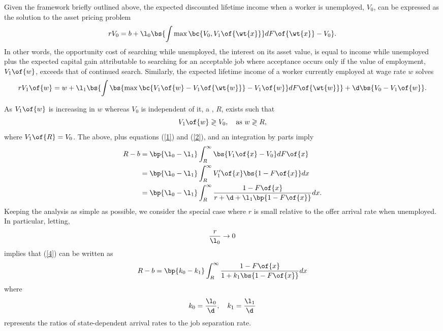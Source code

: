 \documentclass[12pt]{article}
\newcommand{\highlightB}[1]{{\emph{\color{MyBlue}{#1}}}}
\theoremstyle{definition}
\begin{document}
Given the framework briefly outlined above, the expected discounted lifetime income when a worker is unemployed, $V_0$, can be expressed as the solution to the asset pricing problem 
\begin{equation}
    \label{1}
    r V_0 = b + \l_0 \bs{\int \max \bc{V_0, V_1\of{\wt{x}}} d F\of{\wt{x}} - V_0}.
\end{equation}
In other words, the opportunity cost of searching while unemployed, the interest on its asset value, is equal to income while unemployed plus the expected capital gain attributable to searching for an acceptable job where acceptance occurs only if the value of employment, $V_1\of{w}$, exceeds that of continued search. Similarly, the expected lifetime income of a worker currently employed at wage rate $w$ solves 
\begin{equation}
    \label{2}
    r V_1\of{w} = w + \l_1 \bs{ \int \bs{\max\bc{V_1\of{w} - V_1\of{\wt{w}}} - V_1\of{w}} d F\of{\wt{w}}} + \d \bs{V_0 - V_1\of{w}}.
\end{equation}

As $V_1\of{w}$ is increasing in $w$ whereas $V_0$ is independent of it, a \highlightB{reservation wage}, $R$, exists such that 
\begin{equation}
    V_1\of{w} \gtrless V_0, \quad \text{as  } w \gtrless R,
\end{equation}
where $V_1\of{R} = V_0$. The above, plus equations (\ref{1}) and (\ref{2}), and an integration by parts imply 
\begin{equation}
    \label{4}
    \begin{aligned}
        R - b & = \bp{\l_0 - \l_1} \int_{R}^{\infty} \bs{V_1\of{x} - V_0} dF\of{x} \\
        & = \bp{\l_0 - \l_1} \int_{R}^{\infty} V_1^\prime\of{x}\bs{1 - F\of{x}} dx \\
        & = \bp{\l_0 - \l_1} \int_{R}^{\infty} \frac{1 - F\of{x}}{r + \d + \l_1 \bp{1 - F\of{x}}} dx. 
    \end{aligned}
\end{equation}
Keeping the analysis as simple as possible, we consider the special case where $r$ is small relative to the offer arrival rate when unemployed. In particular, letting, $$\frac{r}{\l_0} \rightarrow 0$$ implies that (\ref{4}) can be written as 
\begin{equation}
    \label{5}
    R - b = \bp{k_0 - k_1} \int_{R}^{\infty} \frac{1 - F\of{x}}{1 + k_1\bs{1 - F\of{x}}} d x
\end{equation}
where 
\begin{equation}
    \label{6}
    k_0 = \frac{\l_0}{\d}, \quad k_1 = \frac{\l_1}{\d}
\end{equation}
represents the ratios of state-dependent arrival rates to the job separation rate. 
\end{document}
